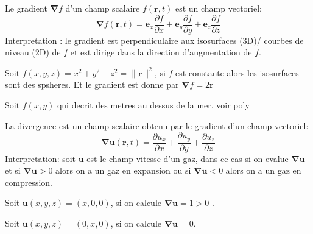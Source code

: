 \begin{definition}[Gradient]
Le gradient $\boldsymbol{\nabla}f$ d'un champ scalaire $f(\boldsymbol{r},t)$ est un champ vectoriel:
$$
\boldsymbol{\nabla}f(\boldsymbol{r},t)=\boldsymbol{e}_{x}\frac{ \partial f }{ \partial x } +\boldsymbol{e}_{y}\frac{ \partial f }{ \partial y } +\boldsymbol{e}_{z}\frac{ \partial f }{ \partial z } 
$$
Interpretation : le gradient est perpendiculaire aux isosurfaces (3D)/ courbes de niveau (2D) de $f$ et est dirige dans la direction d'augmentation de $f$.
\end{definition}
\begin{example}[Cas 3D]
Soit $f(x,y,z)=x^{2}+y^{2}+z^{2}=\lVert \boldsymbol{r} \rVert^{2}$, si $f$ est constante alors les isosurfaces sont des spsheres. Et le gradient est donne par $\boldsymbol{\nabla}f=2\boldsymbol{r}$
\end{example}
\begin{example}
Soit $f(x,y)$ qui decrit des metres au dessus de la mer. voir poly 
\end{example}
\begin{definition}[Divergence]
La divergence est un champ scalaire obtenu par le gradient d'un champ vectoriel:
$$
\boldsymbol{\nabla}\boldsymbol{u}(\boldsymbol{r},t)=\frac{ \partial u_{x} }{ \partial x } +\frac{ \partial u_{y} }{ \partial y } +\frac{ \partial u_{z} }{ \partial z }
$$
Interpretation: soit $\boldsymbol{u}$ est le champ vitesse d'un gaz, dans ce cas si on evalue $\boldsymbol{\nabla u}$ et si $\boldsymbol{\nabla u}>0$ alors on a un gaz en expansion ou si $\boldsymbol{\nabla u}<0$ alors on a un gaz en compression. 
\end{definition}
\begin{example}
Soit $\boldsymbol{u}(x,y,z)=(x,0,0)$, si on calcule $\boldsymbol{\nabla u}=1>0$ .
\end{example}
\begin{example}
Soit $\boldsymbol{u}(x,y,z)=(0,x,0)$, si on calcule $\boldsymbol{\nabla u}=0$.
\end{example}
